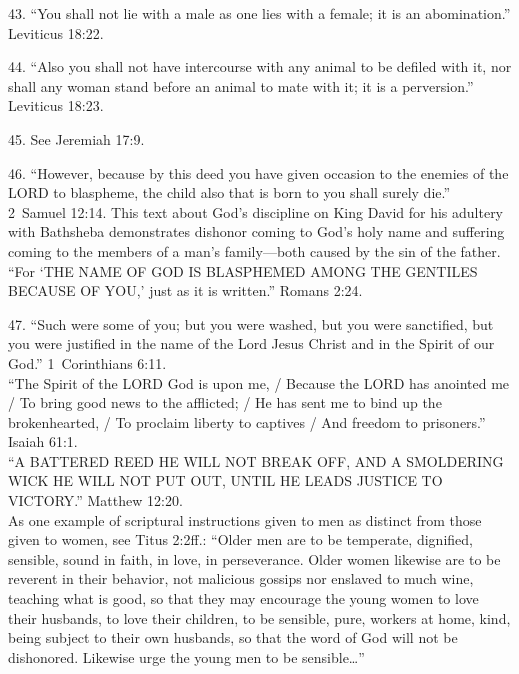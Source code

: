 \documentclass[
]{book}
\begin{document}
43. ``You shall not lie with a male as one lies with a female; it is an abomination.'' Leviticus 18:22.

44. ``Also you shall not have intercourse with any animal to be defiled with it, nor shall any woman stand before an animal to mate with it; it is a perversion.'' Leviticus 18:23.

45. See Jeremiah 17:9.

46. ``However, because by this deed you have given occasion to the enemies of the LORD to blaspheme, the child also that is born to you shall surely die.'' 2~Samuel 12:14. This text about God's discipline on King David for his adultery with Bathsheba demonstrates dishonor coming to God's holy name and suffering coming to the members of a man's family---both caused by the sin of the father.
``For `THE NAME OF GOD IS BLASPHEMED AMONG THE GENTILES BECAUSE OF YOU,' just as it is written.'' Romans 2:24.

47. ``Such were some of you; but you were washed, but you were sanctified, but you were justified in the name of the Lord Jesus Christ and in the Spirit of our God.'' 1~Corinthians 6:11.\\
\hspace*{0.333em}\hspace*{0.333em}\hspace*{0.333em}\hspace*{0.333em}``The Spirit of the LORD God is upon me, / Because the LORD has anointed me / To bring good news to the afflicted; / He has sent me to bind up the brokenhearted, / To proclaim liberty to captives / And freedom to prisoners.'' Isaiah 61:1.\\
\hspace*{0.333em}\hspace*{0.333em}\hspace*{0.333em}\hspace*{0.333em}``A BATTERED REED HE WILL NOT BREAK OFF, AND A SMOLDERING WICK HE WILL NOT PUT OUT, UNTIL HE LEADS JUSTICE TO VICTORY.'' Matthew 12:20.\\
\hspace*{0.333em}\hspace*{0.333em}\hspace*{0.333em}\hspace*{0.333em}As one example of scriptural instructions given to men as distinct from those given to women, see Titus 2:2ff.: ``Older men are to be temperate, dignified, sensible, sound in faith, in love, in perseverance. Older women likewise are to be reverent in their behavior, not malicious gossips nor enslaved to much wine, teaching what is good, so that they may encourage the young women to love their husbands, to love their children, to be sensible, pure, workers at home, kind, being subject to their own husbands, so that the word of God will not be dishonored. Likewise urge the young men to be sensible\ldots{}''
\end{document}
